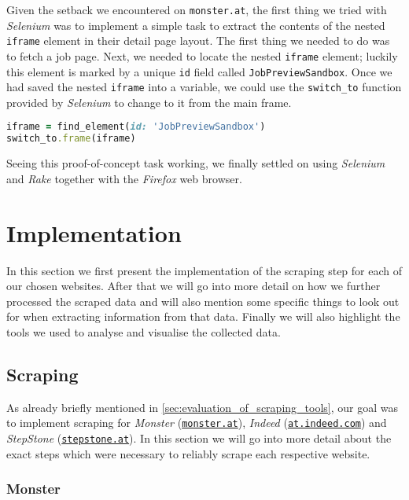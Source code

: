 \documentclass[runningheads]{llncs}
\begin{document}
Given the setback we encountered on \texttt{monster.at}, the first thing we tried with \textit{Selenium} was to implement a simple task to extract the contents of the nested \texttt{iframe} element in their detail page layout. The first thing we needed to do was to fetch a job page. Next, we needed to locate the nested \texttt{iframe} element; luckily this element is marked by a unique \texttt{id} field called \texttt{JobPreviewSandbox}. Once we had saved the nested \texttt{iframe} into a variable, we could use the \texttt{switch\_to} function provided by \textit{Selenium} to change to it from the main frame.

\begin{lstlisting}[language=Ruby]
iframe = find_element(id: 'JobPreviewSandbox')
switch_to.frame(iframe)
\end{lstlisting}

Seeing this proof-of-concept task working, we finally settled on using \textit{Selenium} and \textit{Rake} together with the \textit{Firefox} web browser.

\section{Implementation}
\label{sec:implementation}

In this section we first present the implementation of the scraping step for each of our chosen websites. After that we will go into more detail on how we further processed the scraped data and will also mention some specific things to look out for when extracting information from that data. Finally we will also highlight the tools we used to analyse and visualise the collected data.

\subsection{Scraping}
\label{sub:scraping}

As already briefly mentioned in \autoref{sec:evaluation_of_scraping_tools}, our goal was to implement scraping for \textit{Monster} (\href{https://www.monster.at/}{\texttt{monster.at}}), \textit{Indeed} (\href{https://at.indeed.com/}{\texttt{at.indeed.com}}) and \textit{StepStone} (\href{https://www.stepstone.at/}{\texttt{stepstone.at}}). In this section we will go into more detail about the exact steps which were necessary to reliably scrape each respective website.

\subsubsection{Monster}
\label{subsub:monster}
\end{document}
